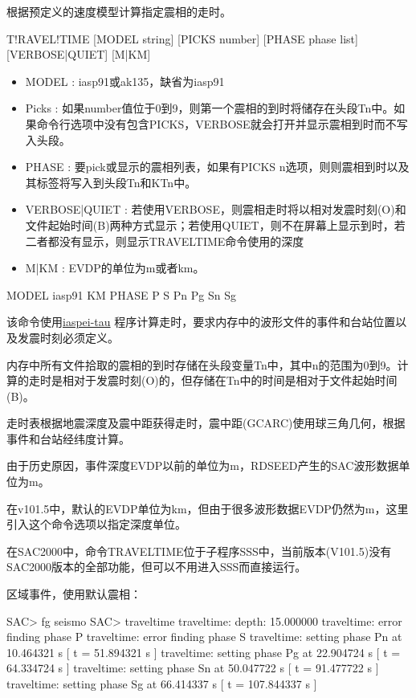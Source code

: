 \label{cmd:traveltime}

根据预定义的速度模型计算指定震相的走时。

\begin{SACSTX}
T!RAVEL!TIME [MODEL string] [PICKS number] [PHASE phase list] 
    [VERBOSE|QUIET] [M|KM]
\end{SACSTX}

\begin{itemize}
\item MODEL : iasp91或ak135，缺省为iasp91
\item Picks : 如果number值位于0到9，则第一个震相的到时将储存在头段Tn中。如果命令行选项中没有包含PICKS，VERBOSE就会打开并显示震相到时而不写入头段。
\item PHASE : 要pick或显示的震相列表，如果有PICKS n选项，则则震相到时以及其标签将写入到头段Tn和KTn中。 
\item VERBOSE|QUIET : 若使用VERBOSE，则震相走时将以相对发震时刻(O)和文件起始时间(B)两种方式显示；若使用QUIET，则不在屏幕上显示到时，若二者都没有显示，则显示TRAVELTIME命令使用的深度 
\item M|KM : EVDP的单位为m或者km。
\end{itemize}

\begin{SACDFT}
MODEL iasp91 KM PHASE P S Pn Pg Sn Sg
\end{SACDFT}

该命令使用\href{http://www.iris.edu/software/downloads/processing/}{iaspei-tau}
程序计算走时，要求内存中的波形文件的事件和台站位置以及发震时刻必须定义。

内存中所有文件拾取的震相的到时存储在头段变量Tn中，其中n的范围为0到9。计算的走时是相对于发震时刻(O)的，但存储在Tn中的时间是相对于文件起始时间(B)。

走时表根据地震深度及震中距获得走时，震中距(GCARC)使用球三角几何，根据事件和台站经纬度计算。

由于历史原因，事件深度EVDP以前的单位为m，RDSEED产生的SAC波形数据单位为m。

在v101.5中，默认的EVDP单位为km，但由于很多波形数据EVDP仍然为m，这里引入这个命令选项以指定深度单位。

在SAC2000中，命令TRAVELTIME位于子程序SSS中，当前版本(V101.5)没有SAC2000版本的全部功能，但可以不用进入SSS而直接运行。

区域事件，使用默认震相：
\begin{SACCode}
SAC> fg seismo
SAC> traveltime 
traveltime: depth: 15.000000
traveltime: error finding phase P       
traveltime: error finding phase S       
traveltime: setting phase Pn       at 10.464321 s [ t = 51.894321 s ]
traveltime: setting phase Pg       at 22.904724 s [ t = 64.334724 s ]
traveltime: setting phase Sn       at 50.047722 s [ t = 91.477722 s ]
traveltime: setting phase Sg      at 66.414337 s [ t = 107.844337 s ]
\end{SACCode} 

